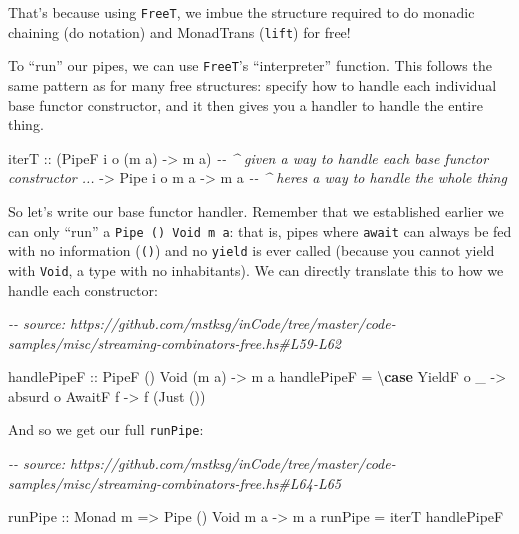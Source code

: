 \documentclass[]{article}
\newenvironment{Shaded}{}{}
\newcommand{\CommentTok}[1]{\textcolor[rgb]{0.38,0.63,0.69}{\textit{#1}}}
\newcommand{\DataTypeTok}[1]{\textcolor[rgb]{0.56,0.13,0.00}{#1}}
\newcommand{\KeywordTok}[1]{\textcolor[rgb]{0.00,0.44,0.13}{\textbf{#1}}}
\newcommand{\NormalTok}[1]{#1}
\newcommand{\OtherTok}[1]{\textcolor[rgb]{0.00,0.44,0.13}{#1}}
\begin{document}
That's because using \texttt{FreeT}, we imbue the structure required to do
monadic chaining (do notation) and MonadTrans (\texttt{lift}) for free!

To ``run'' our pipes, we can use \texttt{FreeT}'s ``interpreter'' function. This
follows the same pattern as for many free structures: specify how to handle each
individual base functor constructor, and it then gives you a handler to handle
the entire thing.

\begin{Shaded}
\begin{Highlighting}[]
\NormalTok{iterT}
\OtherTok{    ::}\NormalTok{ (}\DataTypeTok{PipeF}\NormalTok{ i o (m a) }\OtherTok{{-}>}\NormalTok{ m a)  }\CommentTok{{-}{-} \^{} given a way to handle each base functor constructor ...}
    \OtherTok{{-}>} \DataTypeTok{Pipe}\NormalTok{ i o m a }\OtherTok{{-}>}\NormalTok{ m a       }\CommentTok{{-}{-} \^{} here\textquotesingle{}s a way to handle the whole thing}
\end{Highlighting}
\end{Shaded}

So let's write our base functor handler. Remember that we established earlier we
can only ``run'' a \texttt{Pipe\ ()\ Void\ m\ a}: that is, pipes where
\texttt{await} can always be fed with no information (\texttt{()}) and no
\texttt{yield} is ever called (because you cannot yield with \texttt{Void}, a
type with no inhabitants). We can directly translate this to how we handle each
constructor:

\begin{Shaded}
\begin{Highlighting}[]
\CommentTok{{-}{-} source: https://github.com/mstksg/inCode/tree/master/code{-}samples/misc/streaming{-}combinators{-}free.hs\#L59{-}L62}

\OtherTok{handlePipeF ::} \DataTypeTok{PipeF}\NormalTok{ () }\DataTypeTok{Void}\NormalTok{ (m a) }\OtherTok{{-}>}\NormalTok{ m a}
\NormalTok{handlePipeF }\OtherTok{=}\NormalTok{ \textbackslash{}}\KeywordTok{case}
    \DataTypeTok{YieldF}\NormalTok{ o \_ }\OtherTok{{-}>}\NormalTok{ absurd o}
    \DataTypeTok{AwaitF}\NormalTok{ f   }\OtherTok{{-}>}\NormalTok{ f (}\DataTypeTok{Just}\NormalTok{ ())}
\end{Highlighting}
\end{Shaded}

And so we get our full \texttt{runPipe}:

\begin{Shaded}
\begin{Highlighting}[]
\CommentTok{{-}{-} source: https://github.com/mstksg/inCode/tree/master/code{-}samples/misc/streaming{-}combinators{-}free.hs\#L64{-}L65}

\OtherTok{runPipe ::} \DataTypeTok{Monad}\NormalTok{ m }\OtherTok{=>} \DataTypeTok{Pipe}\NormalTok{ () }\DataTypeTok{Void}\NormalTok{ m a }\OtherTok{{-}>}\NormalTok{ m a}
\NormalTok{runPipe }\OtherTok{=}\NormalTok{ iterT handlePipeF}
\end{Highlighting}
\end{Shaded}
\end{document}
